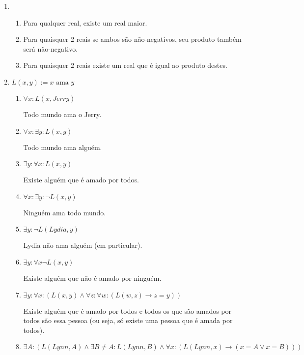\documentclass{article}
\begin{document}
\begin{enumerate}
    \item 
        \begin{enumerate}
            \item Para qualquer real, existe um real maior.
            \item Para quaisquer 2 reais se ambos são não-negativos, seu produto também será não-negativo.
            \item Para quaisquer 2 reais existe um real que é igual ao produto destes.
        \end{enumerate}

    \item \( L(x,y) := x \textrm{ ama } y\) 
        \begin{enumerate}
            \item \( \forall x : L(x,Jerry) \) 

                Todo mundo ama o Jerry.

            \item \( \forall x : \exists y : L(x,y) \)

                Todo mundo ama alguém.

            \item \( \exists y : \forall x : L(x,y) \)

                Existe alguém que é amado por todos.

            \item \( \forall x : \exists y : \neg L(x,y) \)

                Ninguém ama todo mundo.

            \item \( \exists y : \neg L(Lydia,y)  \)

                Lydia não ama alguém (em particular).

            \item \( \exists y : \forall x \neg L(x,y) \)

                Existe alguém que não é amado por ninguém.

            \item \( \exists y : \forall x : (L(x,y) \land \forall z : \forall w : (L(w,z) \to z = y)) \) 

                Existe alguém que é amado por todos e todos os que são amados por todos são essa pessoa (ou seja, só existe uma pessoa que é amada por todos).

            \item \( \exists A : (L(Lynn,A) \land \exists B \neq A : L(Lynn,B) \land \forall x : (L(Lynn, x) \to (x = A \lor x = B))) \)


\end{enumerate}
\end{enumerate}
\end{document}
